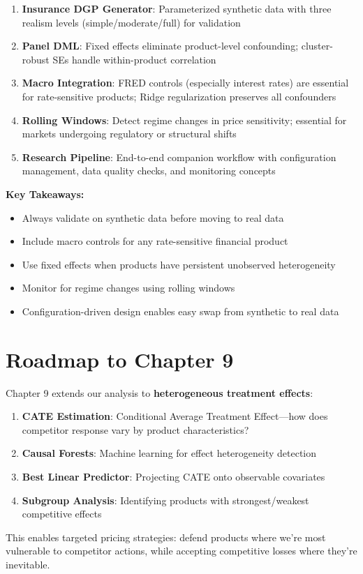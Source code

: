 \begin{enumerate}
    \item \textbf{Insurance DGP Generator}: Parameterized synthetic data with three realism levels (simple/moderate/full) for validation

    \item \textbf{Panel DML}: Fixed effects eliminate product-level confounding; cluster-robust SEs handle within-product correlation

    \item \textbf{Macro Integration}: FRED controls (especially interest rates) are essential for rate-sensitive products; Ridge regularization preserves all confounders

    \item \textbf{Rolling Windows}: Detect regime changes in price sensitivity; essential for markets undergoing regulatory or structural shifts

    \item \textbf{Research Pipeline}: End-to-end companion workflow with configuration management, data quality checks, and monitoring concepts
\end{enumerate}

\textbf{Key Takeaways:}
\begin{itemize}
    \item Always validate on synthetic data before moving to real data
    \item Include macro controls for any rate-sensitive financial product
    \item Use fixed effects when products have persistent unobserved heterogeneity
    \item Monitor for regime changes using rolling windows
    \item Configuration-driven design enables easy swap from synthetic to real data
\end{itemize}

\section{Roadmap to Chapter 9}\label{sec:roadmap_ch08}

Chapter 9 extends our analysis to \textbf{heterogeneous treatment effects}:

\begin{enumerate}
    \item \textbf{CATE Estimation}: Conditional Average Treatment Effect---how does competitor response vary by product characteristics?

    \item \textbf{Causal Forests}: Machine learning for effect heterogeneity detection

    \item \textbf{Best Linear Predictor}: Projecting CATE onto observable covariates

    \item \textbf{Subgroup Analysis}: Identifying products with strongest/weakest competitive effects
\end{enumerate}

This enables targeted pricing strategies: defend products where we're most vulnerable to competitor actions, while accepting competitive losses where they're inevitable.
